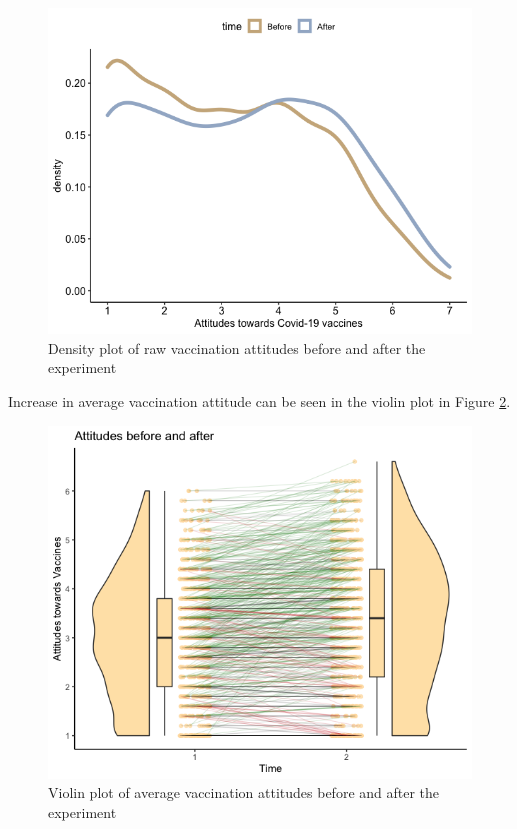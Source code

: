 \documentclass[
  english,
  ,jou,floatsintext]{apa6}
\begin{document}
\begin{figure}

{\centering \includegraphics[width=1\linewidth]{../plots/raw_density} 

}

\caption{Density plot of raw vaccination attitudes before and after the experiment}\label{fig:rawdensity}
\end{figure}

Increase in average vaccination attitude can be seen in the violin plot in Figure \ref{fig:beforeafter}.

\begin{figure}

{\centering \includegraphics[width=1\linewidth]{../plots/before_and_after_violin} 

}

\caption{Violin plot of average vaccination attitudes before and after the experiment}\label{fig:beforeafter}
\end{figure}
\end{document}
